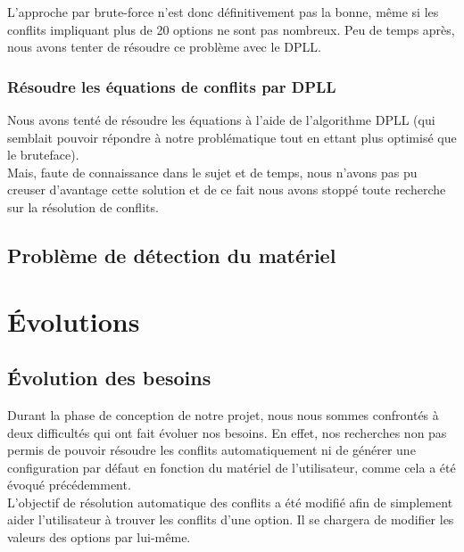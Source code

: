 \documentclass[16pts]{report}
\begin{document}
L'approche par brute-force n'est donc définitivement pas la bonne, même si les
conflits impliquant plus de 20 options ne sont pas nombreux.
Peu de temps après, nous avons tenter de résoudre ce problème avec le DPLL.\\

\subsubsection{Résoudre les équations de conflits par DPLL}
\label{sub:Résoudre les équations de conflits par DPLL}


Nous avons tenté de résoudre les équations à l'aide de l'algorithme DPLL (qui
semblait pouvoir répondre à notre problématique tout en ettant plus optimisé
que le bruteface).\\
Mais, faute de connaissance dans le sujet et de temps, nous n'avons pas pu
creuser d'avantage cette solution et de ce fait nous avons stoppé toute
recherche sur la résolution de conflits.\\


        \subsection{Problème de détection du matériel}
        \label{sub:Problème de détection du matériel}

    \section{Évolutions}
    \label{sec:Évolutions}
        \subsection{Évolution des besoins}
        \label{sec:Évolution des besoins}

Durant la phase de conception de notre projet, nous nous sommes confrontés à 
deux difficultés qui ont fait évoluer nos besoins. En effet, nos recherches 
non pas permis de pouvoir résoudre les conflits automatiquement ni de générer 
une configuration par défaut en fonction du matériel de l'utilisateur, comme
cela a été évoqué précédemment. 
\\

L'objectif de résolution automatique des conflits a été modifié afin de 
simplement aider l'utilisateur à trouver les conflits d'une option. Il se 
chargera de modifier les valeurs des options par lui-même.
\\
\end{document}
